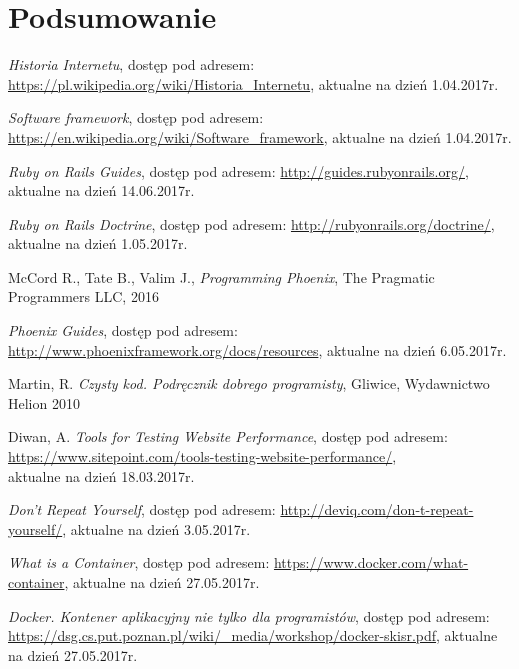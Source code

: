 \documentclass[mgr,oneside]{mgr}
\begin{document}
\chapter{Podsumowanie}
\renewcommand\bibname{Literatura}
\begin{thebibliography}{inteligencja}

  \emph{Historia Internetu}, dostęp pod adresem: \url{https://pl.wikipedia.org/wiki/Historia_Internetu}, aktualne na dzień 1.04.2017r.

  \emph{Software framework}, dostęp pod adresem: \url{https://en.wikipedia.org/wiki/Software_framework}, aktualne na dzień 1.04.2017r.

	\emph{Ruby on Rails Guides}, dostęp pod adresem: \url{http://guides.rubyonrails.org/},\\ aktualne na dzień 14.06.2017r.

  \emph{Ruby on Rails Doctrine}, dostęp pod adresem: \url{http://rubyonrails.org/doctrine/}, aktualne na dzień 1.05.2017r.

  McCord R., Tate B., Valim J., \emph{Programming Phoenix}, The Pragmatic Programmers LLC, 2016

  \emph{Phoenix Guides}, dostęp pod adresem: \url{http://www.phoenixframework.org/docs/resources}, aktualne na dzień 6.05.2017r.

	Martin, R. \emph{Czysty kod. Podręcznik dobrego programisty}, Gliwice, Wydawnictwo Helion 2010

  Diwan, A. \emph{Tools for Testing Website Performance}, dostęp pod adresem: \url{https://www.sitepoint.com/tools-testing-website-performance/}, \\ aktualne na dzień 18.03.2017r.

  \emph{Don't Repeat Yourself}, dostęp pod adresem: \url{http://deviq.com/don-t-repeat-yourself/}, aktualne na dzień 3.05.2017r.

  \emph{What is a Container}, dostęp pod adresem: \url{https://www.docker.com/what-container}, aktualne na dzień 27.05.2017r.

  \emph{Docker. Kontener aplikacyjny nie tylko dla programistów}, dostęp pod adresem: \url{https://dsg.cs.put.poznan.pl/wiki/_media/workshop/docker-skisr.pdf}, aktualne na dzień 27.05.2017r.


\end{thebibliography}
\end{document}
